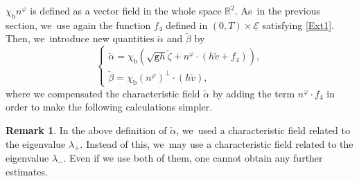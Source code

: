 \documentclass[11pt]{article}
\newcommand{\gr}{{\mathtt g}}
\newcommand{\R}{{\mathbb R}}
\newcommand{\cE}{{\mathcal E}}
\newcommand{\ul}[1]{\underline{#1}}
\theoremstyle{definition}
\newtheorem{remark}[theorem]{Remark}
\begin{document}
$\chi_\mathrm{b}n^\varphi$ is defined as a vector field in the whole space $\R^2$. As~in the previous section, we~use again the function $f_4$ defined in $(0,T)\times\ul{\cE}$ satisfying \eqref{Ext1}.
Then, we~introduce new quantities $\check{\alpha}$ and $\check{\beta}$ by
\begin{equation}\label{defCF}
\begin{cases}
\check{\alpha}=\chi_\mathrm{b}(\sqrt{\gr h}\check{\zeta} + n^\varphi\cdot(h\check{v}+f_4)), \\
\check{\beta}=\chi_\mathrm{b}(n^\varphi)^\perp\cdot(h\check{v}),
\end{cases}
\end{equation}
where we compensated the characteristic field $\check{\alpha}$ by adding the term $n^\varphi\cdot f_4$ in order to make the following calculations simpler.

\begin{remark}
In the above definition of $\check{\alpha}$, we~used a characteristic field related to the eigenvalue $\lambda_+$.
Instead of this, we~may use a characteristic field related to the eigenvalue $\lambda_-$.
Even if we use both of them, one cannot obtain any further estimates.
\end{remark}
\end{document}
